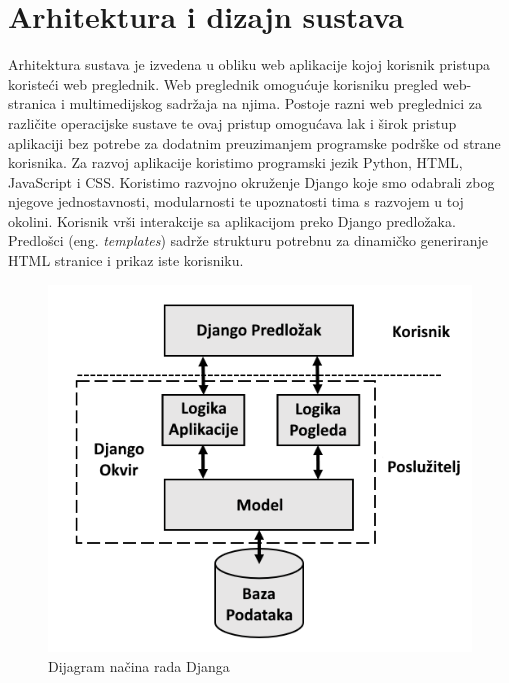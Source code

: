 \chapter{Arhitektura i dizajn sustava}
		
	
		Arhitektura sustava je izvedena u obliku web aplikacije kojoj korisnik pristupa koristeći web preglednik. Web preglednik omogućuje korisniku pregled web-stranica i multimedijskog sadržaja na njima. Postoje razni web preglednici za različite operacijske sustave te ovaj pristup omogućava lak i širok pristup aplikaciji bez potrebe za dodatnim preuzimanjem programske podrške od strane korisnika.
		\newline
		\newline
		\indent Za razvoj aplikacije koristimo programski jezik Python, HTML, JavaScript i CSS. Koristimo razvojno okruženje Django koje smo odabrali zbog njegove jednostavnosti, modularnosti te upoznatosti tima s razvojem u toj okolini.
		Korisnik vrši interakcije sa aplikacijom preko Django predložaka. Predlošci (eng. \textit{templates}) sadrže strukturu potrebnu za dinamičko generiranje HTML stranice i prikaz iste korisniku.



	\begin{figure}[H]
						\includegraphics[scale=0.9]{dijagrami/django.png} 
						\centering
						\caption{Dijagram načina rada Djanga}
						\label{fig:dijagramRadaDjanga}
					\end{figure}

